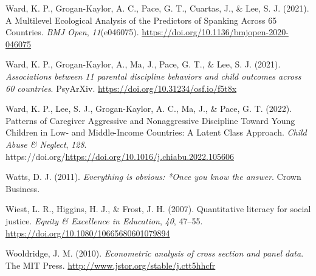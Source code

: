 \documentclass[
  letterpaper,
  DIV=11,
  numbers=noendperiod]{scrreprt}
\newlength{\cslhangindent}
\newlength{\cslentryspacingunit} %
\newenvironment{CSLReferences}[2] %
 {%
  \setlength{\parindent}{0pt}
  \ifodd #1
  \let\oldpar\par
  \def\par{\hangindent=\cslhangindent\oldpar}
  \fi
  \setlength{\parskip}{#2\cslentryspacingunit}
 }%
 {}
\begin{document}
\begin{CSLReferences}{1}{0}
\leavevmode{}%
Ward, K. P., Grogan-Kaylor, A. C., Pace, G. T., Cuartas, J., \& Lee, S.
J. (2021). {A Multilevel Ecological Analysis of the Predictors of
Spanking Across 65 Countries}. \emph{BMJ Open}, \emph{11}(e046075).
\url{https://doi.org/10.1136/bmjopen-2020-046075}

\leavevmode{}%
Ward, K. P., Grogan-Kaylor, A., Ma, J., Pace, G. T., \& Lee, S. J.
(2021). \emph{Associations between 11 parental discipline behaviors and
child outcomes across 60 countries}. PsyArXiv.
\url{https://doi.org/10.31234/osf.io/f5t8x}

\leavevmode{}%
Ward, K. P., Lee, S. J., Grogan-Kaylor, A. C., Ma, J., \& Pace, G. T.
(2022). {Patterns of Caregiver Aggressive and Nonaggressive Discipline
Toward Young Children in Low- and Middle-Income Countries: A Latent
Class Approach}. \emph{Child Abuse \& Neglect}, \emph{128}.
https://doi.org/\url{https://doi.org/10.1016/j.chiabu.2022.105606}

\leavevmode{}%
Watts, D. J. (2011). \emph{Everything is obvious: *Once you know the
answer}. Crown Business.

\leavevmode{}%
Wiest, L. R., Higgins, H. J., \& Frost, J. H. (2007). Quantitative
literacy for social justice. \emph{Equity \& Excellence in Education},
\emph{40}, 47--55. \url{https://doi.org/10.1080/10665680601079894}

\leavevmode{}%
Wooldridge, J. M. (2010). \emph{Econometric analysis of cross section
and panel data}. The MIT Press.
\url{http://www.jstor.org/stable/j.ctt5hhcfr}

\end{CSLReferences}
\end{document}
